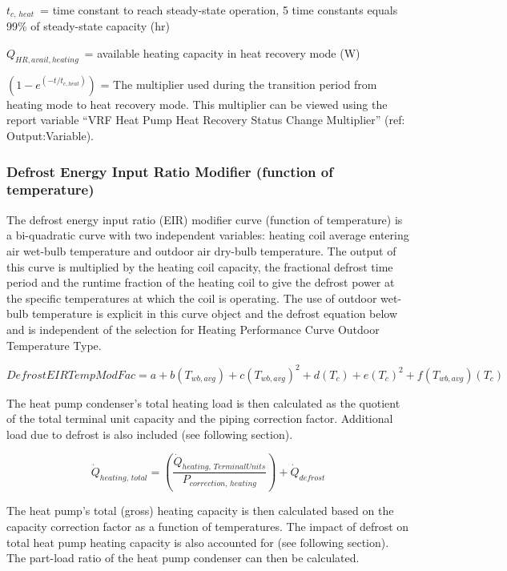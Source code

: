 \(t_{c,\, heat}\) = time constant to reach steady-state operation, 5 time constants equals 99\% of steady-state capacity (hr)

\(Q_{HR,avail,heating}\) = available heating capacity in heat recovery mode (W)

\(\left( 1 - e^{\left( -t / t_{c,heat} \right)} \right)\) = The multiplier used during the transition period from heating mode to heat recovery mode. This multiplier can be viewed using the report variable ``VRF Heat Pump Heat Recovery Status Change Multiplier'' (ref: Output:Variable).

\subsubsection{Defrost Energy Input Ratio Modifier (function of temperature)}\label{defrost-energy-input-ratio-modifier-function-of-temperature}

The defrost energy input ratio (EIR) modifier curve (function of temperature) is a bi-quadratic curve with two independent variables: heating coil average entering air wet-bulb temperature and outdoor air dry-bulb temperature. The output of this curve is multiplied by the heating coil capacity, the fractional defrost time period and the runtime fraction of the heating coil to give the defrost power at the specific temperatures at which the coil is operating. The use of outdoor wet-bulb temperature is explicit in this curve object and the defrost equation below and is independent of the selection for Heating Performance Curve Outdoor Temperature Type.

\begin{equation}
  DefrostEIRTempModFac = a + b\left( {{T_{wb,avg}}} \right) + c{\left( {{T_{wb,avg}}} \right)^2} + d\left( {{T_c}} \right) + e{\left( {{T_c}} \right)^2} + f\left( {{T_{wb,avg}}} \right)\left( {{T_c}} \right)
\end{equation}

The heat pump condenser's total heating load is then calculated as the quotient of the total terminal unit capacity and the piping correction factor. Additional load due to defrost is also included (see following section).

\begin{equation}
  \dot{Q}_{heating,\,total} = \left( \frac{\dot{Q}_{heating,\,TerminalUnits}}{P_{correction,\,heating}} \right) + \dot{Q}_{defrost}
\end{equation}

The heat pump's total (gross) heating capacity is then calculated based on the capacity correction factor as a function of temperatures. The impact of defrost on total heat pump heating capacity is also accounted for (see following section). The part-load ratio of the heat pump condenser can then be calculated.

